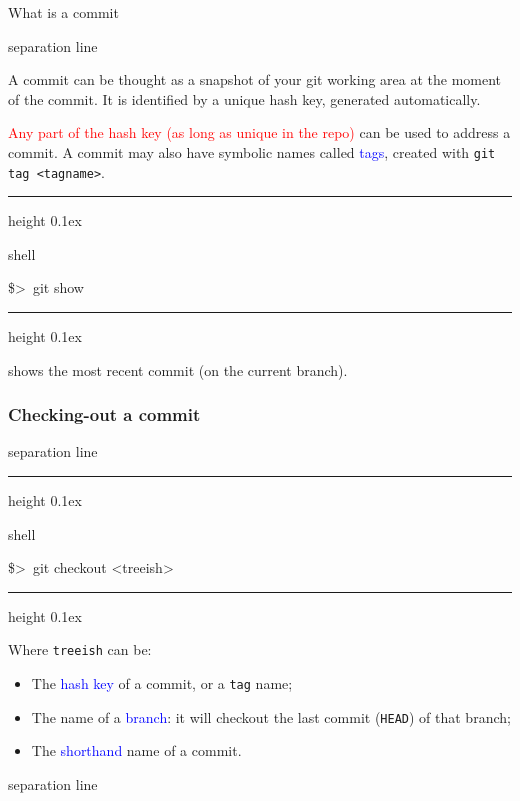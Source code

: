 \documentclass[hyperref={colorlinks}]{beamer}
\newenvironment{shell}{%
\footnotesize\flushleft\hrule height 0.1ex
\tt\begin{beamercolorbox}[sep=1ex,left]{shell}%
}{%
\end{beamercolorbox}
\hrule height 0.1ex
\endflushleft\par
}
\newcommand*{\psone}[1][ant]{\$>~}
\newcommand{\titleline}[1][0.025cm]{%
\begin{beamercolorbox}[wd=\paperwidth,ht=#1,center]{separation line}%
\end{beamercolorbox}%
}
\begin{document}
\begin{frame}{What is a commit}
\titleline
A commit can be thought as a \alert{snapshot of your git working area at the moment of the commit.} It is identified by a unique \alert{hash key},  generated automatically.
\smallskip

\textcolor{red}{Any part of the hash key (as long as unique in the repo)} can be used to address a commit. A commit may also have symbolic names called \textcolor{blue}{tags}, created with \texttt{git tag <tagname>}.

\begin{shell}
\psone git show 
\end{shell}
shows the most recent commit (on the current branch).
\end{frame}



\begin{frame}
  \frametitle{Checking-out a commit}
\titleline
  \begin{shell}
    \psone git checkout <treeish> 
  \end{shell}

  Where \texttt{treeish} can be:
  \begin{itemize}
  \item The \textcolor{blue}{hash key} of a commit, or a \texttt{tag} name;
  \item The name of a \textcolor{blue}{branch}: it will checkout the
    last commit (\texttt{HEAD}) of that branch;
  \item The \textcolor{blue}{shorthand} name of a commit.
  \end{itemize}
\titleline
\end{frame}
\end{document}
